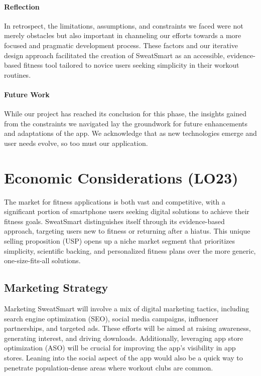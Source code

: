 \documentclass{article}
\begin{document}
\paragraph{Reflection}
In retrospect, the limitations, assumptions, and constraints we faced were not merely obstacles but also important in channeling our efforts towards a more focused and pragmatic development process. These factors and our iterative design approach facilitated the creation of SweatSmart as an accessible, evidence-based fitness tool tailored to novice users seeking simplicity in their workout routines.

\paragraph{Future Work}
While our project has reached its conclusion for this phase, the insights gained from the constraints we navigated lay the groundwork for future enhancements and adaptations of the app. We acknowledge that as new technologies emerge and user needs evolve, so too must our application.

\section{Economic Considerations (LO23)}

The market for fitness applications is both vast and competitive, with a significant portion of smartphone users seeking digital solutions to achieve their fitness goals. SweatSmart distinguishes itself through its evidence-based approach, targeting users new to fitness or returning after a hiatus. This unique selling proposition (USP) opens up a niche market segment that prioritizes simplicity, scientific backing, and personalized fitness plans over the more generic, one-size-fits-all solutions.

\subsection{Marketing Strategy}

Marketing SweatSmart will involve a mix of digital marketing tactics, including search engine optimization (SEO), social media campaigns, influencer partnerships, and targeted ads. These efforts will be aimed at raising awareness, generating interest, and driving downloads. Additionally, leveraging app store optimization (ASO) will be crucial for improving the app’s visibility in app stores. Leaning into the social aspect of the app would also be a quick way to penetrate population-dense areas where workout clubs are common. 
\end{document}
